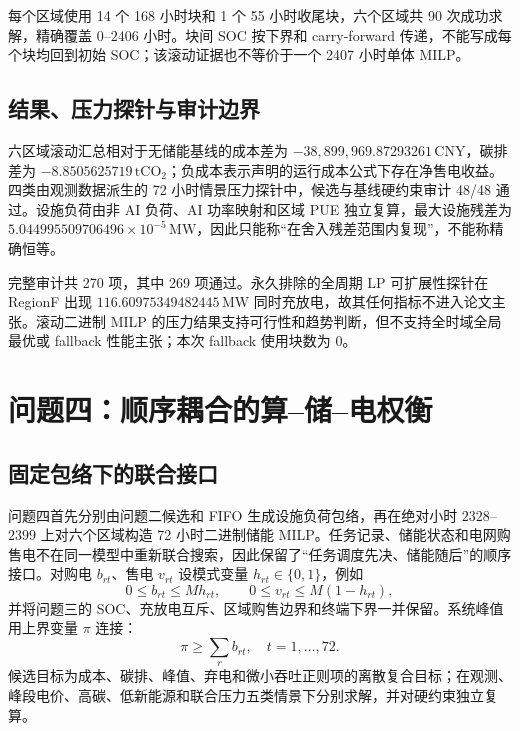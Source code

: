 每个区域使用 14 个 168 小时块和 1 个 55 小时收尾块，六个区域共 90 次成功求解，精确覆盖 $0$--$2406$ 小时。块间 SOC 按下界和 carry-forward 传递，不能写成每个块均回到初始 SOC；该滚动证据也不等价于一个 2407 小时单体 MILP。

\subsection{结果、压力探针与审计边界}

六区域滚动汇总相对于无储能基线的成本差为 $-38,899,969.87293261\,\mathrm{CNY}$，碳排差为 $-8.8505625719\,\mathrm{tCO_2}$；负成本表示声明的运行成本公式下存在净售电收益。四类由观测数据派生的 72 小时情景压力探针中，候选与基线硬约束审计 48/48 通过。设施负荷由非 AI 负荷、AI 功率映射和区域 PUE 独立复算，最大设施残差为 $5.044995509706496\times10^{-5}\,\mathrm{MW}$，因此只能称“在舍入残差范围内复现”，不能称精确恒等。

完整审计共 270 项，其中 269 项通过。永久排除的全周期 LP 可扩展性探针在 RegionF 出现 $116.60975349482445\,\mathrm{MW}$ 同时充放电，故其任何指标不进入论文主张。滚动二进制 MILP 的压力结果支持可行性和趋势判断，但不支持全时域全局最优或 fallback 性能主张；本次 fallback 使用块数为 0。

\section{问题四：顺序耦合的算--储--电权衡}
\label{sec:q4-proposal}

\subsection{固定包络下的联合接口}

问题四首先分别由问题二候选和 FIFO 生成设施负荷包络，再在绝对小时 $2328$--$2399$ 上对六个区域构造 72 小时二进制储能 MILP。任务记录、储能状态和电网购售电不在同一模型中重新联合搜索，因此保留了“任务调度先决、储能随后”的顺序接口。对购电 $b_{rt}$、售电 $v_{rt}$ 设模式变量 $h_{rt}\in\{0,1\}$，例如
\begin{equation}
  0\le b_{rt}\le M h_{rt},\qquad
  0\le v_{rt}\le M(1-h_{rt}),
\end{equation}
并将问题三的 SOC、充放电互斥、区域购售边界和终端下界一并保留。系统峰值用上界变量 $\pi$ 连接：
\begin{equation}
  \pi\ge\sum_r b_{rt},\quad t=1,\ldots,72.
\end{equation}
候选目标为成本、碳排、峰值、弃电和微小吞吐正则项的离散复合目标；在观测、峰段电价、高碳、低新能源和联合压力五类情景下分别求解，并对硬约束独立复算。

